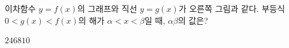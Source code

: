 \noindent\begin{minipage}[t]{0.58\linewidth}\vspace{0pt}\raggedright 이차함수 $y=f(x)$의 그래프와 직선 $y=g(x)$가 오른쪽 그림과 같다. 부등식 $0<g(x)<f(x)$의 해가 $\alpha<x<\beta$일 때, $\alpha\beta$의 값은?\end{minipage}\hfill\begin{minipage}[t]{0.4\linewidth}\vspace{0pt}\centering \resizebox{\ifdim\width>\linewidth\linewidth\else\width\fi}{!}{}\end{minipage}\par
\begin{choices32}{$2$}{$4$}{$6$}{$8$}{$10$}\end{choices32}
